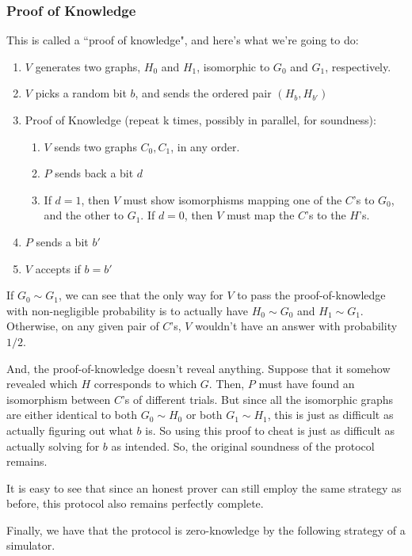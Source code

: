 \documentclass[11pt]{article}
\begin{document}
\subsubsection{Proof of Knowledge}
This is called a ``proof of knowledge", and here's what we're going to do:
\begin{enumerate}
\item \(V\) generates two graphs, \(H_0\) and \(H_1\), isomorphic to \(G_0\) and \(G_1\), respectively.
\item \(V\) picks a random bit \(b\), and sends the ordered pair \((H_b,H_{b'})\)
\item Proof of Knowledge (repeat k times, possibly in parallel, for soundness):
\begin{enumerate}
\item \(V\) sends two graphs \(C_0,C_1\), in any order.
\item \(P\) sends back a bit \(d\)
\item If \(d=1\), then \(V\) must show isomorphisms mapping one of the \(C\)'s to \(G_0\), and the other to \(G_1\). If \(d=0\), then \(V\) must map the \(C\)'s to the \(H\)'s.
\end{enumerate}
\item \(P\) sends a bit \(b'\)
\item \(V\) accepts if \(b=b'\)
\end{enumerate}

If \(G_0\sim G_1\), we can see that the only way for \(V\) to pass the proof-of-knowledge with non-negligible probability is to actually have \(H_0\sim G_0\) and \(H_1\sim G_1\). Otherwise, on any given pair of \(C\)'s, \(V\) wouldn't have an answer with probability \(1/2\).\smallskip

And, the proof-of-knowledge doesn't reveal anything. Suppose that it somehow revealed which \(H\) corresponds to which \(G\). Then, \(P\) must have found an isomorphism between \(C\)'s of different trials. But since all the isomorphic graphs are either identical to both \(G_0\sim H_0\) or both \(G_1\sim H_1\), this is just as difficult as actually figuring out what \(b\) is. So using this proof to cheat is just as difficult as actually solving for \(b\) as intended. So, the original soundness of the protocol remains.\smallskip

It is easy to see that since an honest prover can still employ the same strategy as before, this protocol also remains perfectly complete.\bigskip

Finally, we have that the protocol is zero-knowledge by the following strategy of a simulator. \smallskip
\end{document}
